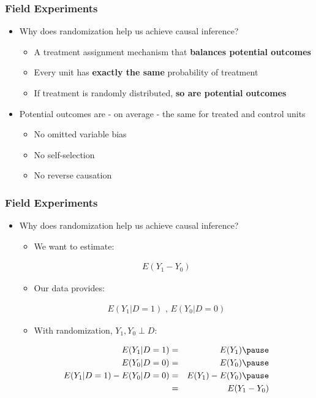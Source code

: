 \documentclass[xcolor=x11names,compress]{beamer}\usepackage[]{graphicx}\usepackage[]{color}
\renewcommand{\(}{\begin{columns}}
\renewcommand{\)}{\end{columns}}
\newcommand{\<}[1]{\begin{column}{#1}}
\renewcommand{\>}{\end{column}}
\begin{document}
\begin{frame}
\frametitle{Field Experiments}
\begin{itemize}
\item Why does randomization help us achieve causal inference?
\pause
\begin{itemize}
\item A treatment assignment mechanism that \textbf{balances potential outcomes}
\item Every unit has \textbf{exactly the same} probability of treatment
\item If treatment is randomly distributed, \textbf{so are potential outcomes}
\end{itemize}
\item Potential outcomes are - on average - the same for treated and control units
\begin{itemize}
\item No omitted variable bias
\item No self-selection
\item No reverse causation
\end{itemize}
\end{itemize}
\end{frame}

\begin{frame}
\frametitle{Field Experiments}
\begin{itemize}
\item Why does randomization help us achieve causal inference?
\begin{itemize}
\item We want to estimate:
\end{itemize}
\begin{eqnarray}
E(Y_1 - Y_0)
\end{eqnarray}
\pause
\begin{itemize}
\item Our data provides:
\end{itemize}
\begin{eqnarray}
E(Y_1|D=1)\text{ ,  }E(Y_0|D=0)
\end{eqnarray}
\pause
\begin{itemize}
\item With randomization, $Y_1, Y_0 \perp D$:
\pause
\end{itemize}
\begin{eqnarray}
E(Y_1|D=1) &=& E(Y_1) \pause \\
E(Y_0|D=0) &=& E(Y_0) \pause \\
E(Y_1|D=1) - E(Y_0|D=0) &=& E(Y_1) - E(Y_0) \pause \\
&=& E(Y_1 - Y_0)
\end{eqnarray}
\end{itemize}
\end{frame}
\end{document}
